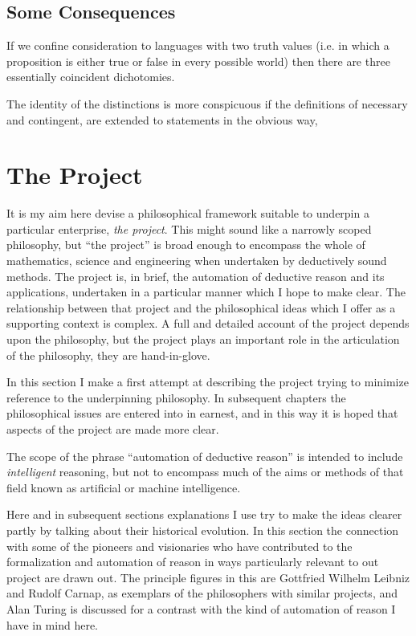 \section{Some Consequences}

If we confine consideration to languages with two truth values (i.e.
in which a proposition is either true or false in every possible world)
then there are three essentially coincident dichotomies.

The identity of the distinctions is more conspicuous if the definitions
of necessary and contingent, are extended to statements in the obvious
way,


\chapter{The Project}\label{TheProject}

It is my aim here devise a philosophical framework suitable to
underpin a particular enterprise, \emph{the project}. 
This might sound like a narrowly scoped philosophy, but ``the
project'' is broad enough to encompass the whole of mathematics,
science and engineering when undertaken by deductively sound methods. 
The project is, in brief, the automation of deductive reason and its
applications, undertaken in a particular manner which I hope to make
clear. 
The relationship between that project and the philosophical ideas
which I offer as a supporting context is complex. 
A full and detailed account of the project depends upon the
philosophy, but the project plays an important role in the
articulation of the philosophy, they are hand-in-glove. 

In this section I make a first attempt at describing the project
trying to minimize reference to the underpinning philosophy. 
In subsequent chapters the philosophical issues are entered into in
earnest, and in this way it is hoped that aspects of the project are
made more clear. 

The scope of the phrase ``automation of deductive reason'' is intended
to include \emph{intelligent} reasoning, but not to encompass much of
the aims or methods of that field known as artificial or machine
intelligence. 

Here and in subsequent sections explanations I use try to make the
ideas clearer partly by talking about their historical evolution. 
In this section the connection with some of the pioneers and
visionaries who have contributed to the formalization and automation
of reason in ways particularly relevant to out project are drawn out. 
The principle figures in this are Gottfried Wilhelm Leibniz and Rudolf
Carnap, as exemplars of the philosophers with similar projects, and
Alan Turing is discussed for a contrast with the kind of automation of
reason I have in mind here. 

